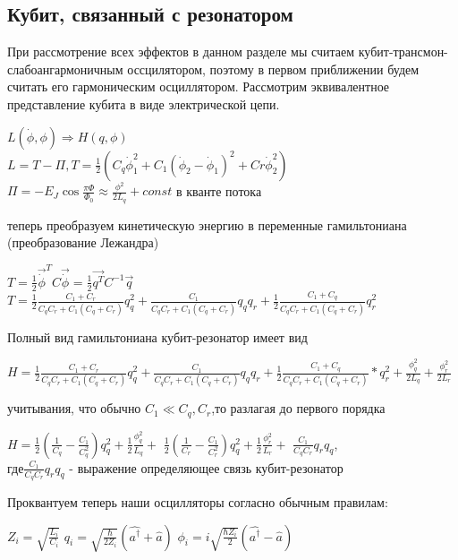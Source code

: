 \documentclass[12pt, a4paper, openany]{book}
\begin{document}
	\subsection{Кубит, связанный с резонатором}
	При рассмотрение всех эффектов в данном разделе мы считаем кубит-трансмон-слабоангармоничным оссцилятором, поэтому в первом приближении будем считать его гармоническим осциллятором. Рассмотрим эквивалентное представление кубита в виде электрической цепи\cite{Zagoskin}.
\begin{center}
$L(\dot{\phi},\phi)\Rightarrow H(q,\phi)$\\
	$L=T-\Pi, T=\frac{1}{2}(C_{q}\dot{\phi}_1^2 + C_1(\dot{\phi}_2 - \dot{\phi}_1)^2 + Cr\dot{\phi}_2^2)$\\
	$\Pi= -E_J\cos{\frac{\pi\Phi}{\Phi_0}} \approx \frac{\phi^2}{2L_q}+const$ в кванте потока
\end{center}
	теперь преобразуем кинетическую энергию в переменные гамильтониана (преобразование Лежандра)
\begin{center}	
	$T=\frac{1}{2}\vec{\dot{\phi}}^TC\vec{\dot{\phi}} = \frac{1}{2}\vec{q^T}C^{-1}\vec{q}$
	$T=\frac{1}{2}\frac{C_1+C_r}{C_qC_r + C_1(C_q + C_r)}q_q^2+
	\frac{C_1}{C_qC_r + C_1(C_q+C_r)}q_qq_r+
	\frac{1}{2}\frac{C_1 + C_q} {C_qC_r + C_1(C_q + C_r)}q_r^2$\\
\end{center}
Полный вид гамильтониана кубит-резонатор имеет вид
\begin{center}	
$H=\frac{1}{2}\frac{C_1+C_r}{C_qC_r + C_1(C_q + C_r)}q_q^2+
	\frac{C_1}{C_qC_r + C_1(C_q+C_r)}q_qq_r+
	\frac{1}{2}\frac{C_1 + C_q} {C_qC_r + C_1(C_q + C_r)}*q_r^2 + \frac{\phi_q^2}{2L_q}+\frac{\phi_r^2}{2L_r}$
\end{center}
учитывания, что обычно $C_1 \ll C_q,C_r$,то разлагая до первого порядка  
\begin{center}	
$H=\frac{1}{2}(\frac{1}{C_q}-\frac{C_1}{C_q^2})q_q^2+\frac{1}{2}\frac{\phi_q^2}{L_q}+$
$\frac{1}{2}(\frac{1}{C_r}-\frac{C_1}{C_r^2})q_q^2+\frac{1}{2}\frac{\phi_r^2}{L_r}+$
$\frac{C_1}{C_qC_r}q_rq_q$,\\
где$\frac{C_1}{C_qC_r}q_rq_q$ - выражение определяющее связь кубит-резонатор\\
\end{center}
Проквантуем теперь наши осцилляторы согласно обычным правилам:
\begin{center}
$Z_i=\sqrt{\frac{L_i}{C_i}}$
$q_i=\sqrt{\frac{\hbar}{2Z_i}}(\hat{a^{\dagger}}+\hat{a})$
$\phi_i=i\sqrt{\frac{\hbar Z_i}{2}}(\hat{a^{\dagger}}-\hat{a})$ \\ 
\end{center}
\end{document}
